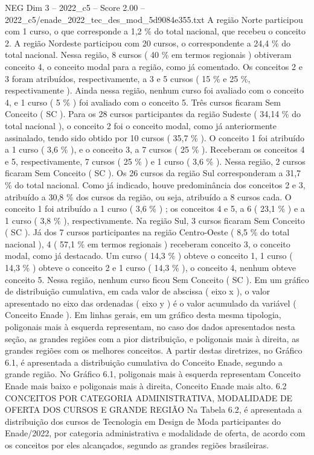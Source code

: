 \begin{textsample}{NEG Dim 3 – 2022\_c5 – Score 2.00 – 2022\_c5/enade\_2022\_tec\_des\_mod\_5d9084e355.txt}
A região Norte participou com 1 curso, o que corresponde a 1,2 \% do total nacional, que recebeu o conceito 2.
A região Nordeste participou com 20 cursos, o correspondente a 24,4 \% do total nacional.
Nessa região, 8 cursos ( 40 \% em termos regionais ) obtiveram conceito 4, o conceito modal para a região, como já comentado.
Os conceitos 2 e 3 foram atribuídos, respectivamente, a 3 e 5 cursos ( 15 \% e 25 \%, respectivamente ).
Ainda nessa região, nenhum curso foi avaliado com o conceito 4, e 1 curso ( 5 \% ) foi avaliado com o conceito 5.
Três cursos ficaram Sem Conceito ( SC ).
Para os 28 cursos participantes da região Sudeste ( 34,14 \% do total nacional ), o conceito 2 foi o conceito modal, como já anteriormente assinalado, tendo sido obtido por 10 cursos ( 35,7 \% ).
O conceito 1 foi atribuído a 1 curso ( 3,6 \% ), e o conceito 3, a 7 cursos ( 25 \% ).
Receberam os conceitos 4 e 5, respectivamente, 7 cursos ( 25 \% ) e 1 curso ( 3,6 \% ).
Nessa região, 2 cursos ficaram Sem Conceito ( SC ).
Os 26 cursos da região Sul corresponderam a 31,7 \% do total nacional.
Como já indicado, houve predominância dos conceitos 2 e 3, atribuído a 30,8 \% dos cursos da região, ou seja, atribuído a 8 cursos cada.
O conceito 1 foi atribuído a 1 curso ( 3,6 \% ) ; os conceitos 4 e 5, a 6 ( 23,1 \% ) e a 1 curso ( 3,8 \% ), respectivamente.
Na região Sul, 3 cursos ficaram Sem Conceito ( SC ).
Já dos 7 cursos participantes na região Centro-Oeste ( 8,5 \% do total nacional ), 4 ( 57,1 \% em termos regionais ) receberam conceito 3, o conceito modal, como já destacado.
Um curso ( 14,3 \% ) obteve o conceito 1, 1 curso ( 14,3 \% ) obteve o conceito 2 e 1 curso ( 14,3 \% ), o conceito 4, nenhum obteve conceito 5.
Nessa região, nenhum curso ficou Sem Conceito ( SC ).
Em um gráfico de distribuição cumulativa, em cada valor de abscissa ( eixo x ), o valor apresentado no eixo das ordenadas ( eixo y ) é o valor acumulado da variável ( Conceito Enade ).
Em linhas gerais, em um gráfico desta mesma tipologia, poligonais mais à esquerda representam, no caso dos dados apresentados nesta seção, as grandes regiões com a pior distribuição, e poligonais mais à direita, as grandes regiões com os melhores conceitos.
A partir destas diretrizes, no Gráfico 6.1, é apresentada a distribuição cumulativa do Conceito Enade, segundo a grande região.
No Gráfico 6.1, poligonais mais à esquerda representam Conceito Enade mais baixo e poligonais mais à direita, Conceito Enade mais alto. 6.2 CONCEITOS POR CATEGORIA ADMINISTRATIVA, MODALIDADE DE OFERTA DOS CURSOS E GRANDE REGIÃO Na Tabela 6.2, é apresentada a distribuição dos cursos de Tecnologia em Design de Moda participantes do Enade/2022, por categoria administrativa e modalidade de oferta, de acordo com os conceitos por eles alcançados, segundo as grandes regiões brasileiras.

\end{textsample}
